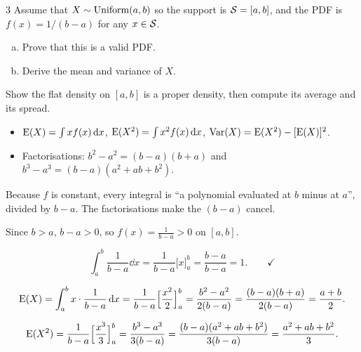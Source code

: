 \documentclass[11pt]{article}
\begin{document}

\begin{problem}{3}
Assume that $X\sim\mathrm{Uniform}(a,b)$ so the support is $\mathcal{S}=[a,b]$, and the PDF is $f(x)=1/(b-a)$ for any $x\in\mathcal{S}$.
\begin{enumerate}[(a)]
\item Prove that this is a valid PDF.
\item Derive the mean and variance of $X$.
\end{enumerate}
\end{problem}

\begin{restate}
Show the flat density on $[a,b]$ is a proper density, then compute its average and its spread.
\end{restate}

\begin{recall}
\begin{itemize}
\item $\mathrm{E}(X)=\int xf(x)\,\mathrm{d} x$, \quad $\mathrm{E}(X^2)=\int x^2f(x)\,\mathrm{d} x$, \quad $\mathrm{Var}(X)=\mathrm{E}(X^2)-[\mathrm{E}(X)]^2$.
\item Factorisations: $b^2-a^2=(b-a)(b+a)$ \quad and \quad $b^3-a^3=(b-a)(a^2+ab+b^2)$.
\end{itemize}
\end{recall}

\begin{keyidea}
Because $f$ is constant, every integral is ``a polynomial evaluated at $b$ minus at $a$'', divided by $b-a$. The factorisations make the $(b-a)$ cancel.
\end{keyidea}

\solution
{}
Since $b>a$, $b-a>0$, so $f(x)=\frac1{b-a}>0$ on $[a,b]$.

\[
\int_a^b\frac{1}{b-a}\dd x=\frac{1}{b-a}\big[x\big]_a^b=\frac{b-a}{b-a}=1.\qquad\checkmark
\]

\[
\mathrm{E}(X)=\int_a^b x\cdot\frac{1}{b-a}\,\mathrm{d} x=\frac{1}{b-a}\Big[\frac{x^2}{2}\Big]_a^b=\frac{b^2-a^2}{2(b-a)}=\frac{(b-a)(b+a)}{2(b-a)}=\frac{a+b}{2}.
\]

\[
\mathrm{E}(X^2)=\frac{1}{b-a}\Big[\frac{x^3}{3}\Big]_a^b=\frac{b^3-a^3}{3(b-a)}=\frac{(b-a)(a^2+ab+b^2)}{3(b-a)}=\frac{a^2+ab+b^2}{3}.
\]
\end{document}
